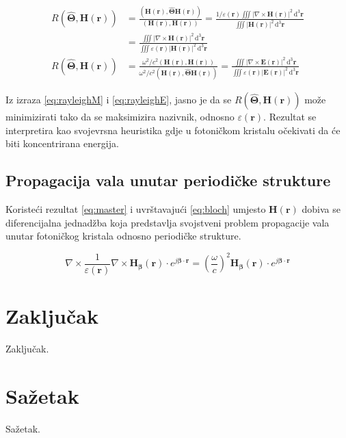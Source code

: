 \documentclass[utf8, seminar]{fer}
\begin{document}
\begin{align} \label{eq:rayleighM}
	R \left( \hat{\mathbf{\Theta}}, \mathbf{H}(\mathbf{r}) \right)
	&= \frac{ \left(
		\mathbf{H}(\mathbf{r}), \hat{\mathbf{\Theta}}\mathbf{H}(\mathbf{r})
		\right)}
	{
		(\mathbf{H}(\mathbf{r}), \mathbf{H}(\mathbf{r}))
	}
	= \frac{ 1/\varepsilon(\mathbf{r})
		\iiint |\nabla \times \mathbf{H}(\mathbf{r})|^2
		\, \mathrm{d}^3\mathbf{r}}
	{\iiint | \mathbf{H}( \mathbf{r} ) |^2
		\, \mathrm{d}^3\mathbf{r}} 								\nonumber \\
	&= \frac{
		\iiint |\nabla \times \mathbf{H}(\mathbf{r})|^2
		\, \mathrm{d}^3\mathbf{r}}
	{\iiint \varepsilon(\mathbf{r}) | \mathbf{H}( \mathbf{r} ) |^2
		\, \mathrm{d}^3\mathbf{r}}										  \\
	R \left( \hat{\mathbf{\Theta}}, \mathbf{H}(\mathbf{r}) \right)
	&= \frac{
		\omega^2/c^2
		\left(
			\mathbf{H}(\mathbf{r}), \mathbf{H}(\mathbf{r})
		\right)
	}
	{
		\omega^2/c^2
		\left(
			\mathbf{H}(\mathbf{r}), \hat{\mathbf{\Theta}}\mathbf{H}(\mathbf{r})
		\right)
	}
	= \frac{
		\iiint |\nabla \times \mathbf{E}(\mathbf{r})|^2
		\, \mathrm{d}^3\mathbf{r}}
	{\iiint \varepsilon(\mathbf{r}) | \mathbf{E}( \mathbf{r} ) |^2
	\, \mathrm{d}^3\mathbf{r}} \label{eq:rayleighE}
\end{align}

Iz izraza \ref{eq:rayleighM} i \ref{eq:rayleighE}, jasno je da se
${R \left( \hat{\mathbf{\Theta}}, \mathbf{H}(\mathbf{r}) \right)}$ može
minimizirati tako da se maksimizira nazivnik, odnosno
${\varepsilon (\mathbf{r})}$. Rezultat se interpretira kao svojevrsna heuristika
gdje u fotoničkom kristalu očekivati da će biti koncentrirana energija.

\section{Propagacija vala unutar periodičke strukture}

Koristeći rezultat \ref{eq:master} i uvrštavajući \ref{eq:bloch} umjesto
$\mathbf{H}(\mathbf{r})$ dobiva se diferencijalna jednadžba koja predstavlja
svojstveni problem propagacije vala unutar fotoničkog kristala odnosno
periodičke strukture.

\begin{equation} \label{eq:master_bloch}
	\nabla \times
	\frac{1}{\varepsilon(\mathbf{r})} \nabla \times
	\mathbf{H}_\mathbf{\beta}(\mathbf{r}) \cdot
	e^{j \mathbf{\beta} \cdot \mathbf{r}}
	= \left(
		\frac{\omega}{c}
	\right)^2
	\mathbf{H}_\mathbf{\beta}(\mathbf{r}) \cdot
		e^{j \mathbf{\beta} \cdot \mathbf{r}}
\end{equation}



\chapter{Zaključak}
Zaključak.




\chapter{Sažetak}
Sažetak.
\end{document}
